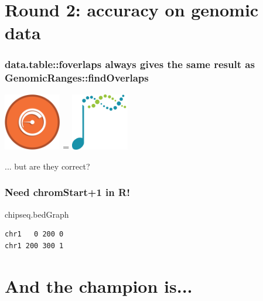 \documentclass{beamer}
\begin{document}

\section{Round 2: accuracy on genomic data}

\begin{frame}
  \frametitle{data.table::foverlaps always gives the same result as
    GenomicRanges::findOverlaps}

    \includegraphics[height=2.5cm]{datatable} =
    \includegraphics[height=2.5cm]{bioconductor} 

    ... but are they correct?
  
\end{frame}

\begin{frame}[fragile]
  \frametitle{Need chromStart+1 in R!}
chipseq.bedGraph
\begin{verbatim}
chr1   0 200 0
chr1 200 300 1
\end{verbatim}





\end{frame}

\section{And the champion is...}
\end{document}
